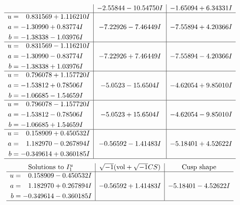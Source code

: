 \documentclass[1p]{elsarticle_modified}
\theoremstyle{definition}
\newcommand{\I}{\sqrt{-1}}
\begin{document}
$$\begin{array}{c|c|c}
 & -2.55844 - 10.54750 I & -1.65094 + 6.34331 I \\ \hline\begin{aligned}
u &= \phantom{-}0.831569 + 1.116210 I \\
a &= -1.30990 + 0.83774 I \\
b &= -1.38338 - 1.03976 I\end{aligned}
 & -7.22926 - 7.46449 I & -7.55894 + 4.20366 I \\ \hline\begin{aligned}
u &= \phantom{-}0.831569 - 1.116210 I \\
a &= -1.30990 - 0.83774 I \\
b &= -1.38338 + 1.03976 I\end{aligned}
 & -7.22926 + 7.46449 I & -7.55894 - 4.20366 I \\ \hline\begin{aligned}
u &= \phantom{-}0.796078 + 1.157720 I \\
a &= -1.53812 + 0.78506 I \\
b &= -1.06685 - 1.54659 I\end{aligned}
 & -5.0523 - 15.6504 I & -4.62054 + 9.85010 I \\ \hline\begin{aligned}
u &= \phantom{-}0.796078 - 1.157720 I \\
a &= -1.53812 - 0.78506 I \\
b &= -1.06685 + 1.54659 I\end{aligned}
 & -5.0523 + 15.6504 I & -4.62054 - 9.85010 I \\ \hline\begin{aligned}
u &= \phantom{-}0.158909 + 0.450532 I \\
a &= \phantom{-}1.182970 - 0.267894 I \\
b &= -0.349614 + 0.360185 I\end{aligned}
 & -0.56592 - 1.41483 I & -5.18401 + 4.52622 I\\
 \hline 
 \end{array}$$\newpage$$\begin{array}{c|c|c}  
\text{Solutions to }I^u_{1}& \I (\text{vol} + \sqrt{-1}CS) & \text{Cusp shape}\\
 \hline 
\begin{aligned}
u &= \phantom{-}0.158909 - 0.450532 I \\
a &= \phantom{-}1.182970 + 0.267894 I \\
b &= -0.349614 - 0.360185 I\end{aligned}
 & -0.56592 + 1.41483 I & -5.18401 - 4.52622 I\\
 \hline 
 \end{array}$$\newpage\newpage\renewcommand{\arraystretch}{1}
\end{document}
